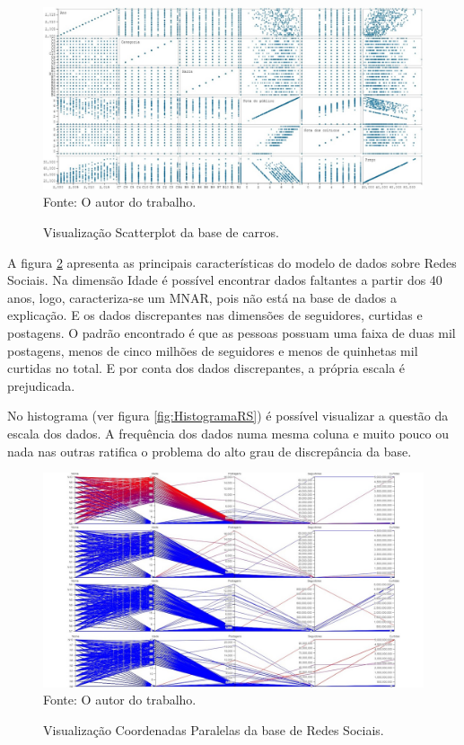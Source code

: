 \documentclass[
	12pt,				%
	openright,			%
	oneside,			%
	a4paper,			%
	english,			%
	brazil				%
	]{abntex2}
\begin{document}
	\begin{figure}[h!]
		\centering
		\caption{Visualização Scatterplot da base de carros.}
		\includegraphics[width=\linewidth]{./figures/Resultados/ScatterPlotC.jpg}
		\label{fig:ScatterPlotC}
		\footnotesize Fonte: O autor do trabalho.
	\end{figure}

	A figura \ref{fig:PCRS} apresenta as principais características do modelo de dados sobre Redes Sociais.
	Na dimensão Idade é possível encontrar dados faltantes a partir dos 40 anos, logo, caracteriza-se um MNAR, pois não está na base de dados a explicação.
	E os dados discrepantes nas dimensões de seguidores, curtidas e postagens.
	O padrão encontrado é que as pessoas possuam uma faixa de duas mil postagens, menos de cinco milhões de seguidores e menos de quinhetas mil curtidas no total.
	E por conta dos dados discrepantes, a própria escala é prejudicada.
	\par

	No histograma (ver figura \ref{fig:HistogramaRS}) é possível visualizar a questão da escala dos dados.
	A frequência dos dados numa mesma coluna e muito pouco ou nada nas outras ratifica o problema do alto grau de discrepância da base.
	\par

	\begin{figure}[h!]
		\centering
		\caption{Visualização Coordenadas Paralelas da base de Redes Sociais.}
		\includegraphics[width=\linewidth]{./figures/Resultados/PCRS.png}
		\label{fig:PCRS}
		\footnotesize Fonte: O autor do trabalho.
	\end{figure}
\end{document}
